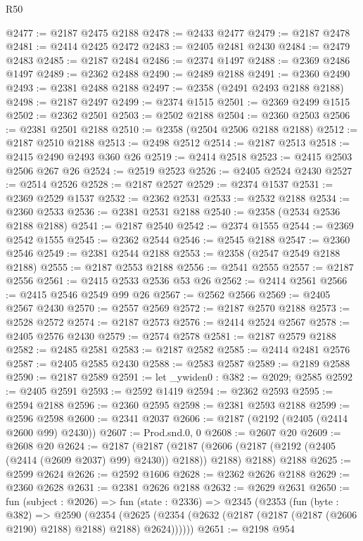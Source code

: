 \begin{lexlean}{R50}
\begin{coremodule}
{{{{{{{{{{{{{{{{{{{{{{{{{{{{{{{{{{{{{{{{{{{{{{{{{{{{{{{{{{{{@2477 := @2187 @2475 @2188
@2478 := @2433 @2477
@2479 := @2187 @2478
@2481 := @2414 @2425 @2472
@2483 := @2405 @2481 @2430
@2484 := @2479 @2483
@2485 := @2187 @2484
@2486 := @2374 @1497
@2488 := @2369 @2486 @1497
@2489 := @2362 @2488
@2490 := @2489 @2188
@2491 := @2360 @2490
@2493 := @2381 @2488 @2188
@2497 := @2358 (@2491 @2493 @2188 @2188)
@2498 := @2187 @2497
@2499 := @2374 @1515
@2501 := @2369 @2499 @1515
@2502 := @2362 @2501
@2503 := @2502 @2188
@2504 := @2360 @2503
@2506 := @2381 @2501 @2188
@2510 := @2358 (@2504 @2506 @2188 @2188)
@2512 := @2187 @2510 @2188
@2513 := @2498 @2512
@2514 := @2187 @2513
@2518 := @2415 @2490 @2493 @360 @26
@2519 := @2414 @2518
@2523 := @2415 @2503 @2506 @267 @26
@2524 := @2519 @2523
@2526 := @2405 @2524 @2430
@2527 := @2514 @2526
@2528 := @2187 @2527
@2529 := @2374 @1537
@2531 := @2369 @2529 @1537
@2532 := @2362 @2531
@2533 := @2532 @2188
@2534 := @2360 @2533
@2536 := @2381 @2531 @2188
@2540 := @2358 (@2534 @2536 @2188 @2188)
@2541 := @2187 @2540
@2542 := @2374 @1555
@2544 := @2369 @2542 @1555
@2545 := @2362 @2544
@2546 := @2545 @2188
@2547 := @2360 @2546
@2549 := @2381 @2544 @2188
@2553 := @2358 (@2547 @2549 @2188 @2188)
@2555 := @2187 @2553 @2188
@2556 := @2541 @2555
@2557 := @2187 @2556
@2561 := @2415 @2533 @2536 @53 @26
@2562 := @2414 @2561
@2566 := @2415 @2546 @2549 @99 @26
@2567 := @2562 @2566
@2569 := @2405 @2567 @2430
@2570 := @2557 @2569
@2572 := @2187 @2570 @2188
@2573 := @2528 @2572
@2574 := @2187 @2573
@2576 := @2414 @2524 @2567
@2578 := @2405 @2576 @2430
@2579 := @2574 @2578
@2581 := @2187 @2579 @2188
@2582 := @2485 @2581
@2583 := @2187 @2582
@2585 := @2414 @2481 @2576
@2587 := @2405 @2585 @2430
@2588 := @2583 @2587
@2589 := @2189 @2588
@2590 := @2187 @2589
@2591 := let _ywiden0 : @382 := @2029; @2585
@2592 := @2405 @2591
@2593 := @2592 @1419
@2594 := @2362 @2593
@2595 := @2594 @2188
@2596 := @2360 @2595
@2598 := @2381 @2593 @2188
@2599 := @2596 @2598
@2600 := @2341 @2037
@2606 := @2187 (@2192 (@2405 (@2414 @2600 @99) @2430))
@2607 := Prod.snd.{0, 0}
@2608 := @2607 @20
@2609 := @2608 @20
@2624 := @2187
    (@2187
      (@2187 (@2606 (@2187 (@2192 (@2405 (@2414 (@2609 @2037) @99) @2430)) @2188)) @2188)
      @2188)
    @2188
@2625 := @2599 @2624
@2626 := @2592 @1606
@2628 := @2362 @2626 @2188
@2629 := @2360 @2628
@2631 := @2381 @2626 @2188
@2632 := @2629 @2631
@2650 := fun (subject : @2026) =>
  fun (state : @2336) =>
  @2345
    (@2353
      (fun (byte : @382) =>
      @2590
        (@2354
          (@2625 (@2354 (@2632 (@2187 (@2187 (@2187 (@2606 @2190) @2188) @2188) @2188) @2624))))))
@2651 := @2198 @954
}}}}}}}}}}}}}}}}}}}}}}}}}}}}}}}}}}}}}}}}}}}}}}}}}}}}}}}}}}}}
\end{coremodule}
\end{lexlean}
